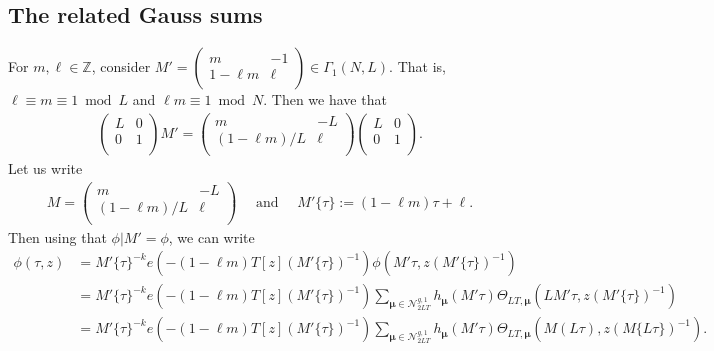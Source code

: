 \documentclass[11pt]{amsart}
\numberwithin{equation}{section}
\newcommand{\mbb}{\mathbb}
\newcommand{\mc}{\mathcal}
\newcommand{\smat}[4]{\left( \begin{smallmatrix} #1 & #2 \\ #3 & #4 \\ \end{smallmatrix} \right)}
\newcommand{\q}{\quad}
\begin{document}
\subsection{The related Gauss sums}
For $m, \ell\in \mbb Z$,  consider $M'=\smat{m}{-1}{1-\ell m}{\ell}\in \Gamma_1(N, L)$. That is, $\ell\equiv m\equiv 1\bmod L$ and $\ell m\equiv 1\bmod N$. Then we have that
\begin{align}
 \smat{L}{0}{0}{1}M'=\smat{m}{-L}{(1-\ell m)/L}{\ell} \smat{L}{0}{0}{1}.   
\end{align}
Let us write 
\begin{align}
 M=\smat{m}{-L}{(1-\ell m)/L}{\ell}\q \text{ and } \q M'\{\tau\}:=(1-\ell m)\tau +\ell.
\end{align}
Then using that $\phi|M'=\phi$, we can write
\begin{align}
    \phi(\tau, z) &=M'\{\tau\}^{-k}e\left(-(1-\ell m)T[z](M'\{\tau\})^{-1}\right)\phi\left(M'\tau, z(M'\{\tau\})^{-1}\right)\\
     &= M'\{\tau\}^{-k}e\left(-(1-\ell m)T[z](M'\{\tau\})^{-1}\right) \sum_{\bm\mu\in\mc N_{2LT}^{g,1}}h_{\bm\mu}(M'\tau)\Theta_{LT, \bm\mu}\left(LM'\tau, z(M'\{\tau\})^{-1}\right)\\
     &= M'\{\tau\}^{-k}e\left(-(1-\ell m)T[z](M'\{\tau\})^{-1}\right) \sum_{\bm\mu\in\mc N_{2LT}^{g,1}}h_{\bm\mu}(M'\tau)\Theta_{LT, \bm\mu}\left(M(L\tau), z(M\{L\tau\})^{-1}\right).
\end{align}
\end{document}
